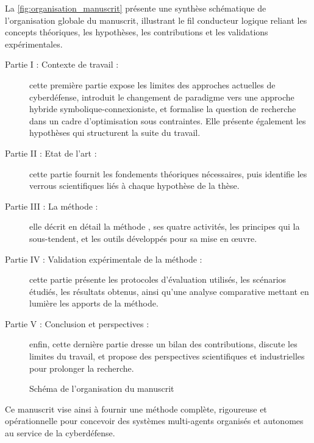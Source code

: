 La \autoref{fig:organisation_manuscrit} présente une synthèse schématique de l'organisation globale du manuscrit, illustrant le fil conducteur logique reliant les concepts théoriques, les hypothèses, les contributions et les validations expérimentales.
%
\begin{description}
    \item[Partie I : Contexte de travail :] cette première partie expose les limites des approches actuelles de cyberdéfense, introduit le changement de paradigme vers une approche hybride symbolique-connexioniste, et formalise la question de recherche dans un cadre d'optimisation sous contraintes. Elle présente également les hypothèses qui structurent la suite du travail.

    \item[Partie II : Etat de l'art :] cette partie fournit les fondements théoriques nécessaires, puis identifie les verrous scientifiques liés à chaque hypothèse de la thèse.

    \item[Partie III : La méthode  :] elle décrit en détail la méthode , ses quatre activités, les principes qui la sous-tendent, et les outils développés pour sa mise en œuvre.

    \item[Partie IV : Validation expérimentale de la méthode :] cette partie présente les protocoles d'évaluation utilisés, les scénarios étudiés, les résultats obtenus, ainsi qu'une analyse comparative mettant en lumière les apports de la méthode.

    \item[Partie V : Conclusion et perspectives :] enfin, cette dernière partie dresse un bilan des contributions, discute les limites du travail, et propose des perspectives scientifiques et industrielles pour prolonger la recherche.
\end{description}
%
\vspace{1em}
%
\begin{figure}[h!]
    \centering
    \resizebox{\textwidth}{!}{%
        
    }
    \caption{Schéma de l'organisation du manuscrit}
    \label{fig:organisation_manuscrit}
\end{figure}
%
Ce manuscrit vise ainsi à fournir une méthode complète, rigoureuse et opérationnelle pour concevoir des systèmes multi-agents organisés et autonomes au service de la cyberdéfense.

\cleardoublepage
